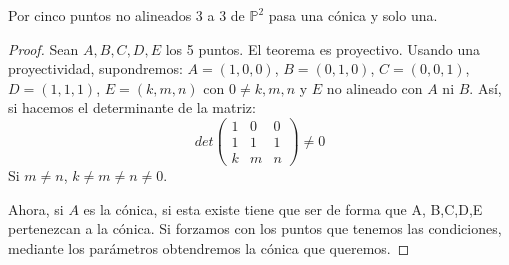 \begin{nth}
	Por cinco puntos no alineados 3 a 3 de $\mathbb P^2$ pasa una cónica y solo una.
\end{nth}
\begin{proof}
	Sean $A,B,C,D,E$ los 5 puntos. El teorema es proyectivo. Usando una proyectividad, supondremos: $A=(1,0,0)$, $B=(0,1,0)$, $C=(0,0,1)$, $D=(1,1,1)$, $E=(k,m,n)$ con $0 \ne k,m,n$ y $E$ no alineado con $A$ ni $B$. Así, si hacemos el determinante de la matriz:
	\[
	det \begin{pmatrix}
 1& 0 & 0\\
1 & 1 & 1\\
k & m & n
\end{pmatrix}  \ne 0
	\]
	Si $m\ne n$, $k\ne m \ne n \ne 0$.

	Ahora, si $A$ es la cónica, si esta existe tiene que ser de forma que A, B,C,D,E pertenezcan a la cónica. Si forzamos con los puntos que tenemos las condiciones, mediante los parámetros obtendremos la cónica que queremos.


\end{proof}
